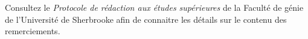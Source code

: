 Consultez le \textit{Protocole de rédaction aux études supérieures} de la Faculté de génie de l'Université de Sherbrooke afin de connaitre les détails sur le contenu des remerciements.

